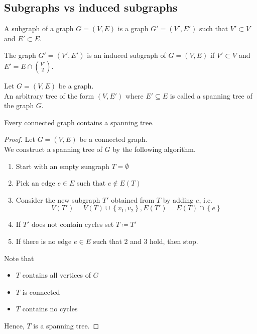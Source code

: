 \documentclass[../main.tex]{subfiles}
\begin{document}
\subsection{Subgraphs vs induced subgraphs}

\begin{defn}[Subgraph]
	A subgraph of a graph $G= ( V,E) $ is a graph $G' = ( V', E') $ such that $V' \subset V $ and $E' \subset E$.
\end{defn}
\begin{defn}
	The graph $G' = ( V', E') $ is an induced subgraph of $G= ( V,E) $ if $V' \subset V$ and $E' = E \cap \binom { V'} 2$.
\end{defn}
\begin{defn}
	Let $G= ( V,E) $ be a graph.\\
	An arbitrary tree of the form $( V, E') $ where $E' \subseteq E$ is called a spanning tree of the graph $G$.
\end{defn}
\begin{lemma}
Every connected graph contains a spanning tree.
\end{lemma}
\begin{proof}
	Let $G= ( V,E) $ be a connected graph.\\
	We construct a spanning tree of $G$ by the following algorithm.
	\begin{enumerate}
	\item Start with an empty sungraph $ T = \emptyset$ 
	\item Pick an edge $e \in E$ such that $e \notin E( T) $ 
	\item Consider the new subgraph $T' $ obtained from $T$ by adding $e$, i.e.
		\[ 
			V( T') = V( T) \cup \left\{ v_1,v_2 \right\} , E( T') = E( T) \cap \left\{ e  \right\} 
		\]
	
	\item If $T'$ does not contain cycles set $T \coloneqq  T'$ 
	\item If there is no edge $e \in E$ such that 2 and $3$ hold, then stop.
	\end{enumerate}
	Note that
	\begin{itemize}
	\item $T$ contains all vertices of $G$ 
	\item $T$ is connected
	\item $T$ contains no cycles
	\end{itemize}
	Hence, $T$ is a spanning tree.
\end{proof}
\end{document}
